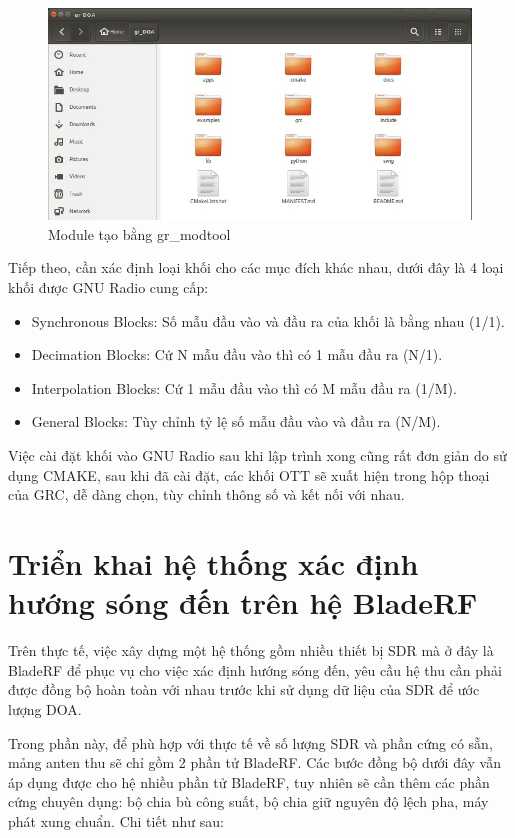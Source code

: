 \begin{figure} [!h]
	\centering
	\includegraphics[width=1\linewidth]{figures/grmodtool.jpg}
	\caption{Module tạo bằng gr\_modtool}
	\label{fig:grmodtool}
\end{figure}

Tiếp theo, cần xác định loại khối cho các mục đích khác nhau, dưới đây là 4 loại khối được GNU Radio cung cấp:
\renewcommand{\labelitemi}{$-$}
\begin{itemize}
	\item Synchronous Blocks: Số mẫu đầu vào và đầu ra của khối là bằng nhau (1/1).
	\item Decimation Blocks: Cứ N mẫu đầu vào thì có 1 mẫu đầu ra (N/1).
	\item Interpolation Blocks: Cứ 1 mẫu đầu vào thì có M mẫu đầu ra (1/M).
	\item General Blocks: Tùy chỉnh tỷ lệ số mẫu đầu vào và đầu ra (N/M).
\end{itemize}

Việc cài đặt khối vào GNU Radio sau khi lập trình xong cũng rất đơn giản do sử dụng CMAKE, sau khi đã cài đặt, các khối OTT sẽ xuất hiện trong hộp thoại của GRC, dễ dàng chọn, tùy chỉnh thông số và kết nối với nhau.

\section{Triển khai hệ thống xác định hướng sóng đến trên hệ BladeRF}

Trên thực tế, việc xây dựng một hệ thống gồm nhiều thiết bị SDR mà ở đây là BladeRF để phục vụ cho việc xác định hướng sóng đến, yêu cầu hệ thu cần phải được đồng bộ hoàn toàn với nhau trước khi sử dụng dữ liệu của SDR để ước lượng DOA.

Trong phần này, để phù hợp với thực tế về số lượng SDR và phần cứng có sẵn, mảng anten thu sẽ chỉ gồm 2 phần tử BladeRF. Các bước đồng bộ dưới đây vẫn áp dụng được cho hệ nhiều phần tử BladeRF, tuy nhiên sẽ cần thêm các phần cứng chuyên dụng: bộ chia bù công suất, bộ chia giữ nguyên độ lệch pha, máy phát xung chuẩn. Chi tiết như sau: 

